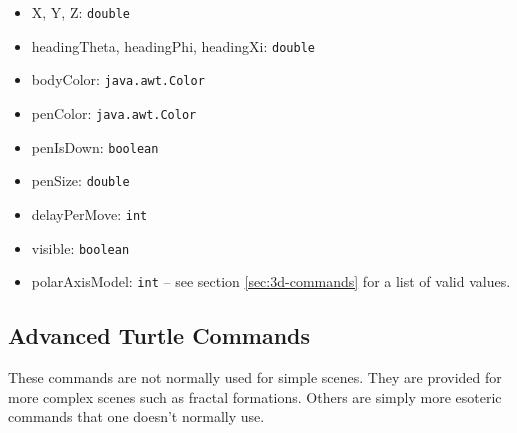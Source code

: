 \documentclass{article}
\begin{document}
      \begin{itemize}
	\item X, Y, Z: {\tt double}
	\item headingTheta, headingPhi, headingXi: {\tt double}
	\item bodyColor: {\tt java.awt.Color}
	\item penColor: {\tt java.awt.Color}
	\item penIsDown: {\tt boolean}
	\item penSize: {\tt double}
	\item delayPerMove: {\tt int}
	\item visible: {\tt boolean}
	\item polarAxisModel: {\tt int} -- see section \ref{sec:3d-commands} for
	      a list of valid values.
      \end{itemize}

    \subsection{Advanced Turtle Commands}
      \label{sec:advanced-commands}

      These commands are not normally used for simple scenes. They are provided
      for more complex scenes such as fractal formations. Others are simply more
      esoteric commands that one doesn't normally use.
\end{document}
